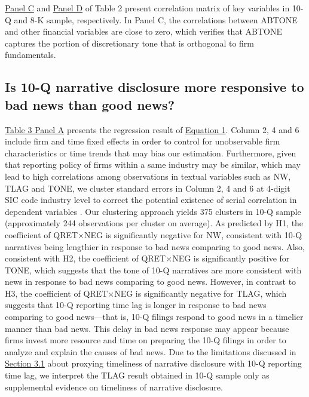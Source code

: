 \documentclass[a4paper]{article}
\begin{document}
\begin{spacing}{2}
\hyperref[T2PC]{Panel C} and \hyperref[T2PD]{Panel D} of Table 2 present correlation matrix of key variables in 10-Q and 8-K sample, respectively. In Panel C, the correlations between ABTONE and other financial variables are close to zero, which verifies that ABTONE captures the portion of discretionary tone that is orthogonal to firm fundamentals. 

\subsection{Is 10-Q narrative disclosure more responsive to bad news than good news?}
\hyperref[T3PA]{Table 3 Panel A} presents the regression result of \hyperref[eq1]{Equation 1}. Column 2, 4 and 6 include firm and time fixed effects in order to control for unobservable firm characteristics or time trends that may bias our estimation. Furthermore, given that reporting policy of firms within a same industry may be similar, which may lead to high correlations among observations in textual variables such as NW, TLAG and TONE, we cluster standard errors in Column 2, 4 and 6 at 4-digit SIC code industry level to correct the potential existence of serial correlation in dependent variables \citep*{petersenEstimatingStandardErrors2009}. Our clustering approach yields 375 clusters in 10-Q sample (approximately 244 observations per cluster on average). As predicted by H1, the coefficient of QRET$\times$NEG is significantly negative for NW, consistent with 10-Q narratives being lengthier in response to bad news comparing to good news. Also, consistent with H2, the coefficient of QRET$\times$NEG is significantly positive for TONE, which suggests that the tone of 10-Q narratives are more consistent with news in response to bad news comparing to good news. However, in contrast to H3, the coefficient of QRET$\times$NEG is significantly negative for TLAG, which suggests that 10-Q reporting time lag is longer in response to bad news comparing to good news---that is, 10-Q filings respond to good news in a timelier manner than bad news. This delay in bad news response may appear because firms invest more resource and time on preparing the 10-Q filings in order to analyze and explain the causes of bad news. Due to the limitations discussed in \hyperref[sec3.1]{Section 3.1} about proxying timeliness of narrative disclosure with 10-Q reporting time lag, we interpret the TLAG result obtained in 10-Q sample only as supplemental evidence on timeliness of narrative disclosure.


\end{spacing}
\end{document}
